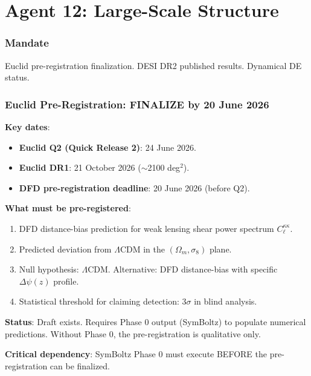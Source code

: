 \documentclass[11pt,a4paper]{article}
\begin{document}
\part{Agent 12: Large-Scale Structure}
\label{part:agent12}

\section{Mandate}

Euclid pre-registration finalization. DESI DR2 published results. Dynamical DE status.

\section{Euclid Pre-Registration: FINALIZE by 20 June 2026}

\begin{tcolorbox}[colback=red!5!white, colframe=red!60!black,
  title={DEADLINE: Euclid Pre-Registration --- 20 June 2026}]

\textbf{Key dates}:
\begin{itemize}
\item \textbf{Euclid Q2 (Quick Release 2)}: 24 June 2026.
\item \textbf{Euclid DR1}: 21 October 2026 ($\sim$2100 deg$^2$).
\item \textbf{DFD pre-registration deadline}: 20 June 2026 (before Q2).
\end{itemize}

\textbf{What must be pre-registered}:
\begin{enumerate}
\item DFD distance-bias prediction for weak lensing shear power spectrum $C_\ell^{\kappa\kappa}$.
\item Predicted deviation from $\Lambda$CDM in the $(\Omega_m, \sigma_8)$ plane.
\item Null hypothesis: $\Lambda$CDM. Alternative: DFD distance-bias with specific $\Delta\psi(z)$ profile.
\item Statistical threshold for claiming detection: $3\sigma$ in blind analysis.
\end{enumerate}

\textbf{Status}: Draft exists. Requires Phase 0 output (SymBoltz) to populate numerical predictions. Without Phase 0, the pre-registration is qualitative only.

\textbf{Critical dependency}: SymBoltz Phase 0 must execute BEFORE the pre-registration can be finalized.
\end{tcolorbox}
\end{document}

